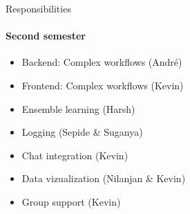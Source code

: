 \begin{frame}{Responsibilities}
\framesubtitle{Second semester}
	\begin{itemize}
		\item Backend: Complex workflows (André)
		\item Frontend: Complex workflows (Kevin)
		\item Ensemble learning  (Harsh)
		\item Logging (Sepide \& Suganya)
		\item Chat integration (Kevin)
		\item Data vizualization (Nilanjan \& Kevin)
		\item Group support (Kevin)
	\end{itemize}
\end{frame}